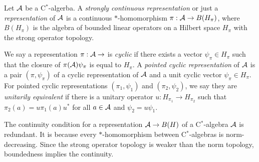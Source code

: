 \documentclass{../../small}
\begin{document}
\begin{defn}
Let $\mathcal{A}$ be a C$^*$-algerba.
A \emph{strongly continuous representation} or just a \emph{representation} of $\mathcal{A}$ is a continuous $*$-homomorphism $\pi:\mathcal{A}\to B(H_\pi)$, where $B(H_\pi)$ is the algebra of bounded linear operators on a Hilbert space $H_\pi$ with the strong operator topology.

We say a representation $\pi:\mathcal{A}\to$ is \emph{cyclic} if there exists a vector $\psi_\pi\in H_\pi$ such that the closure of $\pi(\mathcal{A})\psi_\pi$ is equal to $H_\pi$.
A \emph{pointed cyclic representation} of $\mathcal{A}$ is a pair $(\pi,\psi_\pi)$ of a cyclic representation of $\mathcal{A}$ and a unit cyclic vector $\psi_\pi\in H_\pi$.
For pointed cyclic representations $(\pi_1,\psi_1)$ and $(\pi_2,\psi_2)$, we say they are \emph{unitarily equivalent} if there is a unitary operator $u:H_{\pi_1}\to H_{\pi_2}$ such that $\pi_2(a)=u\pi_1(a)u^*$ for all $a\in\mathcal{A}$ and $\psi_2=u\psi_1$.
\end{defn}

\begin{rmk}
The continuity condition for a representation $\mathcal{A}\to B(H)$ of a C$^*$-algebra $\mathcal{A}$ is redundant.
It is because every $*$-homomorphism between C$^*$-algebras is norm-decreasing.
Since the strong operator topology is weaker than the norm topology, boundedness implies the continuity.
\end{rmk}
\end{document}
